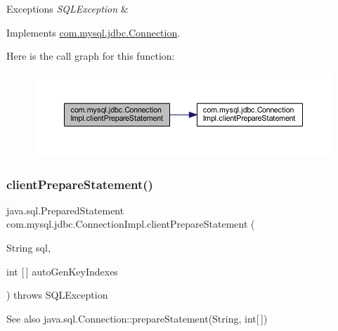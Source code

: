 \begin{DoxyExceptions}{Exceptions}
{\em S\+Q\+L\+Exception} & \\
\hline
\end{DoxyExceptions}


Implements \mbox{\hyperlink{interfacecom_1_1mysql_1_1jdbc_1_1_connection_a3d058c3722d0afd1cdc4254a9b813c74}{com.\+mysql.\+jdbc.\+Connection}}.

Here is the call graph for this function\+:\nopagebreak
\begin{figure}[H]
\begin{center}
\leavevmode
\includegraphics[width=350pt]{classcom_1_1mysql_1_1jdbc_1_1_connection_impl_a5e079f628e46e372708355bf45f8c7a3_cgraph}
\end{center}
\end{figure}
\mbox{\label{classcom_1_1mysql_1_1jdbc_1_1_connection_impl_a7c16e87fcf61b55c5737bd2f041a847a}} 
\subsubsection{\texorpdfstring{client\+Prepare\+Statement()}{clientPrepareStatement()}\hspace{0.1cm}{\footnotesize\ttfamily [4/6]}}
{\footnotesize\ttfamily java.\+sql.\+Prepared\+Statement com.\+mysql.\+jdbc.\+Connection\+Impl.\+client\+Prepare\+Statement (\begin{DoxyParamCaption}\item[{String}]{sql,  }\item[{int \mbox{[}$\,$\mbox{]}}]{auto\+Gen\+Key\+Indexes }\end{DoxyParamCaption}) throws S\+Q\+L\+Exception}

\begin{DoxySeeAlso}{See also}
java.\+sql.\+Connection\+::prepare\+Statement(\+String, int\mbox{[}$\,$\mbox{]}) 
\end{DoxySeeAlso}


